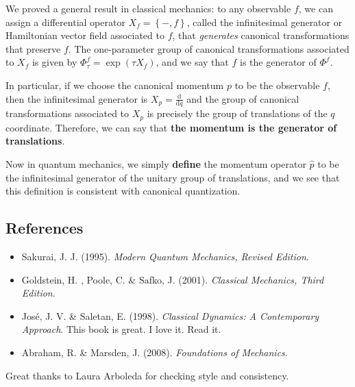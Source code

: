 \documentclass[11pt,a4]{article}
\newcommand{\de}{\mathrm{d}}
\newcommand{\tdev}[2]{\frac{\de #1}{\de #2}}
\newcommand{\set}[1]{\left\{#1\right\}}
\begin{document}
We proved a general result in classical mechanics: to any observable $f$, we can assign a differential
operator $X_f=\set{-,f}$, called the infinitesimal generator or Hamiltonian vector field associated to $f$,
that \emph{generates} canonical transformations that preserve $f$. The one-parameter group of
canonical transformations associated to $X_f$ is given by $\Phi^f_\tau = \exp(\tau X_f)$, and we
say that $f$ is the generator of $\Phi^f$.

In particular, if we choose the canonical momentum $p$ to be the observable $f$, then the infinitesimal generator is $X_p = \tdev{}{q}$ and the group of canonical transformations associated to $X_p$ is precisely the group of translations of the $q$ coordinate.
Therefore, we can say that \textbf{the momentum is the generator of translations}.

Now in quantum mechanics, we simply \textbf{define} the momentum operator $\hat{p}$ to be the infinitesimal
generator of the unitary group of translations, and we see that this definition is consistent with canonical
quantization.

\subsection*{References}
\label{sec:references}

\begin{itemize}
\item Sakurai, J. J. (1995). \textit{Modern Quantum Mechanics, Revised Edition}.
\item Goldstein, H. , Poole, C. \& Safko, J. (2001). \textit{Classical Mechanics, Third Edition}.
\item José, J. V. \& Saletan, E. (1998). \textit{Classical Dynamics: A Contemporary Approach}. This book is great. I love it. Read it.
\item Abraham, R. \& Marsden, J. (2008). \textit{Foundations of Mechanics}.
\end{itemize}
Great thanks to Laura Arboleda for checking style and consistency.
\end{document}
